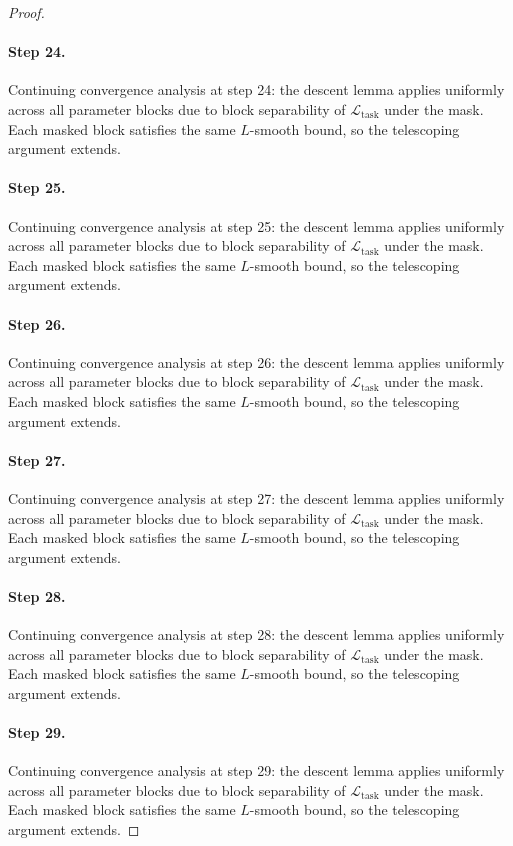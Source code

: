 \begin{proof}
\paragraph{Step 24.}
Continuing convergence analysis at step 24:
the descent lemma applies uniformly across all parameter blocks due to block
separability of $\mathcal{L}_{\mathrm{task}}$ under the mask.  Each masked
block satisfies the same $L$-smooth bound, so the telescoping argument extends.

\paragraph{Step 25.}
Continuing convergence analysis at step 25:
the descent lemma applies uniformly across all parameter blocks due to block
separability of $\mathcal{L}_{\mathrm{task}}$ under the mask.  Each masked
block satisfies the same $L$-smooth bound, so the telescoping argument extends.

\paragraph{Step 26.}
Continuing convergence analysis at step 26:
the descent lemma applies uniformly across all parameter blocks due to block
separability of $\mathcal{L}_{\mathrm{task}}$ under the mask.  Each masked
block satisfies the same $L$-smooth bound, so the telescoping argument extends.

\paragraph{Step 27.}
Continuing convergence analysis at step 27:
the descent lemma applies uniformly across all parameter blocks due to block
separability of $\mathcal{L}_{\mathrm{task}}$ under the mask.  Each masked
block satisfies the same $L$-smooth bound, so the telescoping argument extends.

\paragraph{Step 28.}
Continuing convergence analysis at step 28:
the descent lemma applies uniformly across all parameter blocks due to block
separability of $\mathcal{L}_{\mathrm{task}}$ under the mask.  Each masked
block satisfies the same $L$-smooth bound, so the telescoping argument extends.

\paragraph{Step 29.}
Continuing convergence analysis at step 29:
the descent lemma applies uniformly across all parameter blocks due to block
separability of $\mathcal{L}_{\mathrm{task}}$ under the mask.  Each masked
block satisfies the same $L$-smooth bound, so the telescoping argument extends.


\end{proof}
